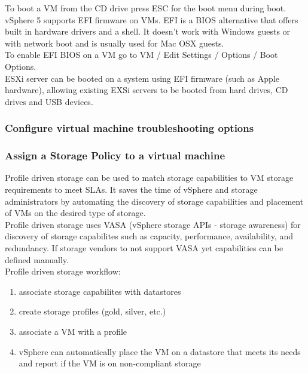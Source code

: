 To boot a VM from the CD drive press ESC for the boot menu during boot.\\

vSphere 5 supports EFI firmware on VMs. EFI is a BIOS alternative that offers
built in hardware drivers and a shell. It doesn't work with Windows guests
or with network boot and is usually used for Mac OSX guests.\\

To enable EFI BIOS on a VM go to VM / Edit Settings / Options / Boot Options.\\

ESXi server can be booted on a system using EFI firmware (such as Apple
hardware), allowing existing EXSi servers to be booted from hard drives, CD
drives and USB devices.

\subsubsection{Configure virtual machine troubleshooting options}

\subsubsection{Assign a Storage Policy to a virtual machine}

Profile driven storage can be used to match storage capabilities to VM storage
requirements to meet SLAs. It saves the time of vSphere and storage
administrators by automating the discovery of storage capabilities and
placement of VMs on the desired type of storage.\\

Profile driven storage uses VASA (vSphere storage APIs - storage awareness)
for discovery of storage capabilites such as capacity, performance,
availability, and redundancy. If storage vendors to not support VASA yet
capabilities can be defined manually.\\

Profile driven storage workflow:

\begin{enumerate}

\item associate storage capabilites with datastores

\item create storage profiles (gold, silver, etc.)

\item associate a VM with a profile

\item vSphere can automatically place the VM on a datastore that meets its
needs and report if the VM is on non-compliant storage

\end{enumerate}

